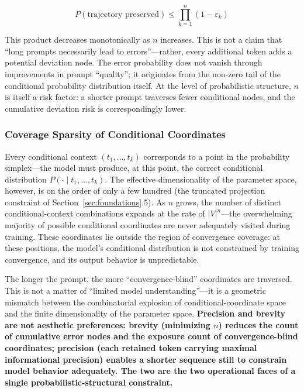 \documentclass[11pt,a4paper]{article}
\theoremstyle{definition}
\begin{document}
\begin{equation}
P(\text{trajectory preserved}) \leq \prod_{k=1}^{n} (1-\varepsilon_k)
\end{equation}

This product decreases monotonically as $n$ increases. This is not a claim that ``long prompts necessarily lead to errors''---rather, every additional token adds a potential deviation node. The error probability does not vanish through improvements in prompt ``quality''; it originates from the non-zero tail of the conditional probability distribution itself. At the level of probabilistic structure, $n$ is itself a risk factor: a shorter prompt traverses fewer conditional nodes, and the cumulative deviation risk is correspondingly lower.

\subsubsection{Coverage Sparsity of Conditional Coordinates}

Every conditional context $(t_1, \ldots, t_k)$ corresponds to a point in the probability simplex---the model must produce, at this point, the correct conditional distribution $P(\cdot \mid t_1, \ldots, t_k)$. The effective dimensionality of the parameter space, however, is on the order of only a few hundred (the truncated projection constraint of Section~\ref{sec:foundations}.5). As $n$ grows, the number of distinct conditional-context combinations expands at the rate of $|V|^n$---the overwhelming majority of possible conditional coordinates are never adequately visited during training. These coordinates lie outside the region of convergence coverage: at these positions, the model's conditional distribution is not constrained by training convergence, and its output behavior is unpredictable.

The longer the prompt, the more ``convergence-blind'' coordinates are traversed. This is not a matter of ``limited model understanding''---it is a geometric mismatch between the combinatorial explosion of conditional-coordinate space and the finite dimensionality of the parameter space. \textbf{Precision and brevity are not aesthetic preferences: brevity (minimizing $n$) reduces the count of cumulative error nodes and the exposure count of convergence-blind coordinates; precision (each retained token carrying maximal informational precision) enables a shorter sequence still to constrain model behavior adequately. The two are the two operational faces of a single probabilistic-structural constraint.}
\end{document}
